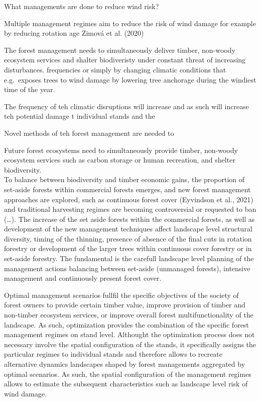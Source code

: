 \documentclass[]{elsarticle} %
\begin{document}
What managements are done to reduce wind risk?

Multiple management regimes aim to reduce the risk of wind damage for example by reducing rotation age Zimová et al. (2020)

The forest management needs to simultaneously deliver timber, non-woody ecosystem services and shalter biodiveristy under constant threat of increasing disturbances. frequencies or simply by changing climatic conditions that e.g.~exposes trees to wind damage by lowering tree anchorage during the windiest time of the year.

The frequency of teh climatic disruptions will increase and as such will increase teh potential damage t individual stands and the

Novel methods of teh forest management are needed to

Future forest ecosystems need to simultaneously provide timber, non-woody ecosystem services such as carbon storage or human recreation, and shelter biodiversity.\\
To balance between biodiversity and timber economic gains, the proportion of set-aside forests within commercial forests emerges, and new forest management approaches are explored, such as continuous forest cover (Eyvindson et al., 2021) and traditional harvesting regimes are becoming controversial or requested to ban (\ldots). The increase of the set aside forests within the commercial forests, as well as development of the new management techniques affect landscape level structural diversity, timing of the thinning, presence of absence of the final cuts in rotation forestry or development of the larger trees within continuous cover forestry or in set-aside forestry. The fundamental is the carefull landscape level planning of the management actions balancing between set-aside (unmanaged forests), intensive management and continuously present forest cover.

Optimal management scenarios fullfil the specific objectives of the society of forest owners to provide certain timber value, improve provision of timber and non-timber ecosystem services, or improve overall forest multifunctionality of the landscape. As such, optimization provides the combination of the specific forest management regimes on stand level. Althought the optimization process does not necessary involve the spatial configuration of the stands, it specifically assigns the particular regimes to individual stands and therefore allows to recreate alternative dynamics landscapes shaped by forest managements aggregated by optimal scenarios. As such, the spatial configuration of the management regimes allows to estimate the subsequent characteristics such as landscape level risk of wind damage.
\end{document}
